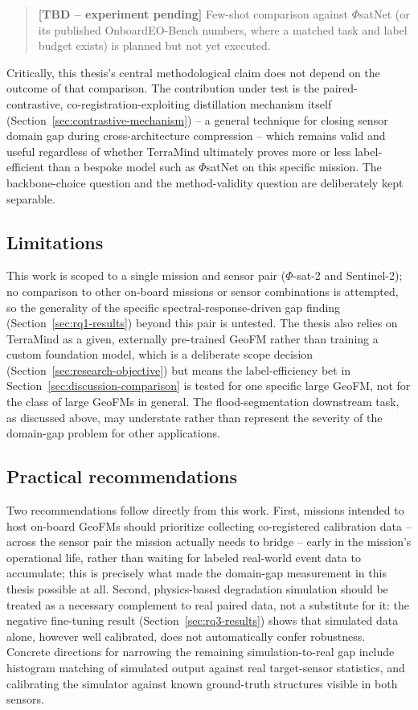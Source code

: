 \begin{quote}
    \textbf{[TBD -- experiment pending]}
    Few-shot comparison against $\Phi$satNet (or its published OnboardEO-Bench numbers, where a matched task and label budget exists) is planned but not yet executed.
\end{quote}

Critically, this thesis's central methodological claim does not depend on the outcome of that comparison.
The contribution under test is the paired-contrastive, co-registration-exploiting distillation mechanism itself (Section~\ref{sec:contrastive-mechanism}) -- a general technique for closing sensor domain gap during cross-architecture compression -- which remains valid and useful regardless of whether TerraMind ultimately proves more or less label-efficient than a bespoke model such as $\Phi$satNet on this specific mission.
The backbone-choice question and the method-validity question are deliberately kept separable.

\subsection{Limitations}

This work is scoped to a single mission and sensor pair ($\Phi$-sat-2 and Sentinel-2); no comparison to other on-board missions or sensor combinations is attempted, so the generality of the specific spectral-response-driven gap finding (Section~\ref{sec:rq1-results}) beyond this pair is untested.
The thesis also relies on TerraMind as a given, externally pre-trained GeoFM rather than training a custom foundation model, which is a deliberate scope decision (Section~\ref{sec:research-objective}) but means the label-efficiency bet in Section~\ref{sec:discussion-comparison} is tested for one specific large GeoFM, not for the class of large GeoFMs in general.
The flood-segmentation downstream task, as discussed above, may understate rather than represent the severity of the domain-gap problem for other applications.

\subsection{Practical recommendations}

Two recommendations follow directly from this work.
First, missions intended to host on-board GeoFMs should prioritize collecting co-registered calibration data -- across the sensor pair the mission actually needs to bridge -- early in the mission's operational life, rather than waiting for labeled real-world event data to accumulate; this is precisely what made the domain-gap measurement in this thesis possible at all.
Second, physics-based degradation simulation should be treated as a necessary complement to real paired data, not a substitute for it: the negative fine-tuning result (Section~\ref{sec:rq3-results}) shows that simulated data alone, however well calibrated, does not automatically confer robustness.
Concrete directions for narrowing the remaining simulation-to-real gap include histogram matching of simulated output against real target-sensor statistics, and calibrating the simulator against known ground-truth structures visible in both sensors.
